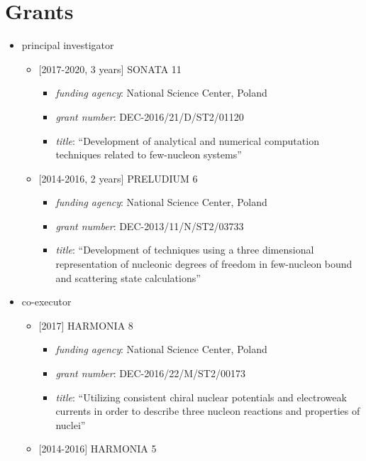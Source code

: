 \documentclass{article}
\providecommand{\tightlist}{%
  \setlength{\itemsep}{0pt}\setlength{\parskip}{0pt}}
\begin{document}
\hypertarget{grants}{%
\section*{Grants}\label{grants}}

\begin{itemize}
\tightlist
\item
  principal investigator

  \begin{itemize}
  \tightlist
  \item
    {[}2017-2020, 3 years{]} SONATA 11

    \begin{itemize}
    \tightlist
    \item
      \emph{funding agency}: National Science Center, Poland
    \item
      \emph{grant number}: DEC-2016/21/D/ST2/01120
    \item
      \emph{title}: ``Development of analytical and numerical
      computation techniques related to few-nucleon systems''
    \end{itemize}
  \item
    {[}2014-2016, 2 years{]} PRELUDIUM 6

    \begin{itemize}
    \tightlist
    \item
      \emph{funding agency}: National Science Center, Poland
    \item
      \emph{grant number}: DEC-2013/11/N/ST2/03733
    \item
      \emph{title}: ``Development of techniques using a three
      dimensional representation of nucleonic degrees of freedom in
      few-nucleon bound and scattering state calculations''
    \end{itemize}
  \end{itemize}
\item
  co-executor

  \begin{itemize}
  \tightlist
  \item
    {[}2017{]} HARMONIA 8

    \begin{itemize}
    \tightlist
    \item
      \emph{funding agency}: National Science Center, Poland
    \item
      \emph{grant number}: DEC-2016/22/M/ST2/00173
    \item
      \emph{title}: ``Utilizing consistent chiral nuclear potentials and
      electroweak currents in order to describe three nucleon reactions
      and properties of nuclei''
    \end{itemize}
  \item
    {[}2014-2016{]} HARMONIA 5


\end{itemize}
\end{itemize}
\end{document}
